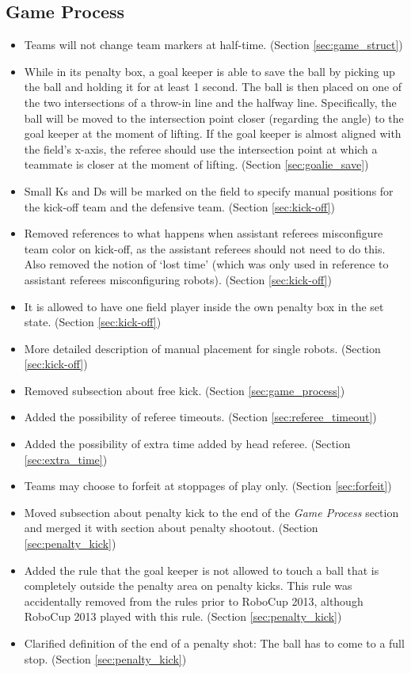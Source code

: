 \documentclass[12pt]{article}
\begin{document}
\subsection*{Game Process}
\begin{itemize}
	\item Teams will not change team markers at half-time. (Section \ref{sec:game_struct})
	\item While in its penalty box, a goal keeper is able to save the ball by picking up the ball and holding it for at least 1 second.  The ball is then placed on one of the two intersections of a throw-in line and the halfway line.  Specifically, the ball will be moved to the intersection point closer (regarding the angle) to the goal keeper at the moment of lifting.  If the goal keeper is almost aligned with the field's x-axis, the referee should use the intersection point at which a teammate is closer at the moment of lifting. (Section \ref{sec:goalie_save}) 
	\item Small Ks and Ds will be marked on the field to specify manual positions for the kick-off team and the defensive team. (Section \ref{sec:kick-off})
	\item Removed references to what happens when assistant referees misconfigure team color on kick-off, as the assistant referees should not need to do this.  Also removed the notion of `lost time' (which was only used in reference to assistant referees misconfiguring robots). (Section \ref{sec:kick-off})
	\item It is allowed to have one field  player inside the own penalty box in the set state. (Section \ref{sec:kick-off})
	\item More detailed description of manual placement for single robots. (Section \ref{sec:kick-off})
	\item Removed subsection about free kick. (Section \ref{sec:game_process})
  \item Added the possibility of referee timeouts. (Section \ref{sec:referee_timeout})
  \item Added the possibility of extra time added by head referee. (Section \ref{sec:extra_time})
  \item Teams may choose to forfeit at stoppages of play only. (Section \ref{sec:forfeit})
	\item Moved subsection about penalty kick to the end of the \textit{Game Process} section and merged it with section about penalty shootout. (Section \ref{sec:penalty_kick})
	\item Added the rule that the goal keeper is not allowed to touch a ball that is completely outside the penalty area on penalty kicks.  This rule was accidentally removed from the rules prior to RoboCup 2013, although RoboCup 2013 played with this rule. (Section \ref{sec:penalty_kick})
	\item Clarified definition of the end of a penalty shot: The ball has to come to a full stop. (Section \ref{sec:penalty_kick})
\end{itemize}
\end{document}
